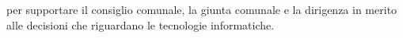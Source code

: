  per supportare il consiglio comunale, la giunta comunale e la dirigenza in merito alle decisioni che riguardano le tecnologie informatiche.





